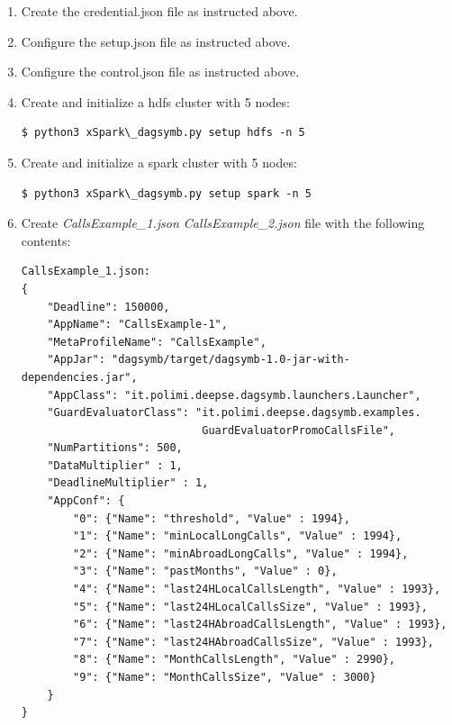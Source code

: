 \begin{enumerate}
\def\labelenumi{\arabic{enumi})}
\item
Create the credential.json file as instructed above.
\item
Configure the setup.json file as instructed above.
\item
Configure the control.json file as instructed above.
\item
Create and initialize a hdfs cluster with 5 nodes:

\begin{verbatim}
$ python3 xSpark\_dagsymb.py setup hdfs -n 5
\end{verbatim}
\item
Create and initialize a spark cluster with 5 nodes:
\begin{verbatim}
$ python3 xSpark\_dagsymb.py setup spark -n 5
\end{verbatim}
\item
Create \emph{CallsExample\_1.json CallsExample\_2.json} file with the following contents:
\begin{verbatim}
CallsExample_1.json:
{
    "Deadline": 150000,
    "AppName": "CallsExample-1",
    "MetaProfileName": "CallsExample",
    "AppJar": "dagsymb/target/dagsymb-1.0-jar-with-dependencies.jar",
    "AppClass": "it.polimi.deepse.dagsymb.launchers.Launcher",
    "GuardEvaluatorClass": "it.polimi.deepse.dagsymb.examples.
                            GuardEvaluatorPromoCallsFile",
    "NumPartitions": 500,
    "DataMultiplier" : 1,
    "DeadlineMultiplier" : 1,
    "AppConf": {
        "0": {"Name": "threshold", "Value" : 1994},
        "1": {"Name": "minLocalLongCalls", "Value" : 1994},
        "2": {"Name": "minAbroadLongCalls", "Value" : 1994},
        "3": {"Name": "pastMonths", "Value" : 0},
        "4": {"Name": "last24HLocalCallsLength", "Value" : 1993},
        "5": {"Name": "last24HLocalCallsSize", "Value" : 1993},
        "6": {"Name": "last24HAbroadCallsLength", "Value" : 1993},
        "7": {"Name": "last24HAbroadCallsSize", "Value" : 1993},
        "8": {"Name": "MonthCallsLength", "Value" : 2990},
        "9": {"Name": "MonthCallsSize", "Value" : 3000}
    }
}


\end{verbatim}
\end{enumerate}
